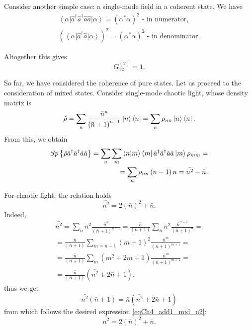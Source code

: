 Consider another simple case: a single-mode field in a coherent state. We have
\begin{eqnarray}
\left<\alpha\right|\hat{a}^{\dag}\hat{a}^{\dag}\hat{a}\hat{a}\left|\alpha\right>
= \left(\alpha^{*}\alpha\right)^2
\mbox{ - in numerator},
\nonumber \\
\left(\left<\alpha\right|\hat{a}^{\dag}\hat{a}\left|\alpha\right>\right)^2
= \left(\alpha^{*}\alpha\right)^2
\mbox{ - in denominator}.
\nonumber
\end{eqnarray}

Altogether this gives
\[
G^{(2)}_{12} = 1.
\]

So far, we have considered the coherence of pure states. Let us proceed to the consideration of mixed states. Consider single-mode chaotic light, whose density matrix  is  
\[
\hat{\rho} = \sum_{n}\frac{\bar{n}^n}{\left(\bar{n} + 1\right)^{n +
    1}} \ket{n}\bra{n} = 
\sum_n\rho_{nn}\ket{n}\bra{n}.
\]
From this, we obtain
\begin{eqnarray}
Sp \left\{\hat{\rho}\hat{a}^{\dag}\hat{a}^{\dag}\hat{a}\hat{a}\right\} = 
\sum_{n}\sum_{m}\bra{n}\ket{m}\bra{m}
\hat{a}^{\dag}\hat{a}^{\dag}\hat{a}\hat{a}
\ket{m} \rho_{mm} = 
\nonumber \\
= \sum_{n}\rho_{nn}\left(n - 1\right)n = \bar{n^2} - \bar{n}.
\label{eqCh4_add1_sp}
\end{eqnarray}

For chaotic light, the relation holds
\begin{equation}
\bar{n^2} = 2
\left(\bar{n}\right)^2 + \bar{n}.
\label{eqCh4_add1_mid_n2}
\end{equation}
Indeed,
\begin{eqnarray}
\bar{n^2} = 
\sum_n n^2 \frac{\bar{n}^n}{\left(\bar{n} + 1\right)^{n + 1}} = 
\frac{\bar{n}}{\left(\bar{n} + 1\right)}\sum_n n^2
\frac{\bar{n}^{n-1}}{\left(\bar{n} + 1\right)^{n}} =
\nonumber \\
= 
\frac{\bar{n}}{\left(\bar{n} + 1\right)}\sum_{m = n -1} \left(m +
1\right)^2
\frac{\bar{n}^m}{\left(\bar{n} + 1\right)^{m + 1}} = 
\nonumber \\
= \frac{\bar{n}}{\left(\bar{n} + 1\right)}\sum_m
\left(m^2 + 2 m + 1\right)
\frac{\bar{n}^m}{\left(\bar{n} + 1\right)^{m + 1}} = 
\nonumber \\
=
\frac{\bar{n}}{\left(\bar{n} + 1\right)}\left(\bar{n^2} + 2 \bar{n} +
1\right),
\nonumber
\end{eqnarray}
thus we get
\begin{equation}
\bar{n^2}\left(\bar{n} + 1\right) = 
\bar{n}\left(\bar{n^2} + 2 \bar{n} + 1\right)
\nonumber
\end{equation}
from which follows the desired expression \eqref{eqCh4_add1_mid_n2}:
\begin{equation}
\bar{n^2} = 2
\left(\bar{n}\right)^2 + \bar{n}.
\nonumber
\end{equation}

